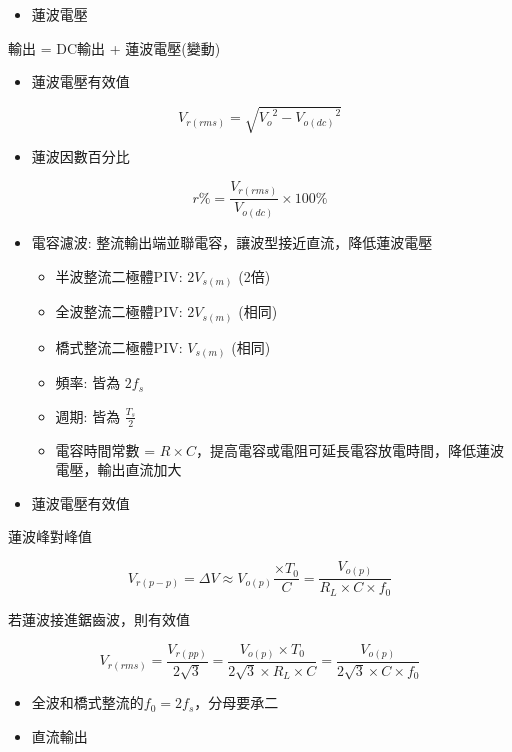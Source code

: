 \documentclass[
]{report}
\providecommand{\tightlist}{%
  \setlength{\itemsep}{0pt}\setlength{\parskip}{0pt}}
\begin{document}
\begin{itemize}
\tightlist
\item
  蓮波電壓
\end{itemize}

輸出 = DC輸出 + 蓮波電壓(變動)

\begin{itemize}
\tightlist
\item
  蓮波電壓有效值
\end{itemize}

\[
V_{r(rms)} = \sqrt{{V_o}^2 - {V_{o(dc)}}^2}
\]

\begin{itemize}
\tightlist
\item
  蓮波因數百分比
\end{itemize}

\[
r\% = \frac{V_{r(rms)}}{V_{o(dc)}} \times 100\%
\]

\begin{itemize}
\tightlist
\item
  電容濾波: 整流輸出端並聯電容，讓波型接近直流，降低蓮波電壓

  \begin{itemize}
  \tightlist
  \item
    半波整流二極體PIV: \(2V_{s(m)}\) (2倍)
  \item
    全波整流二極體PIV: \(2V_{s(m)}\) (相同)
  \item
    橋式整流二極體PIV: \(V_{s(m)}\) (相同)
  \item
    頻率: 皆為 \(2f_s\)
  \item
    週期: 皆為 \(\frac{T_s}{2}\)
  \item
    電容時間常數 =
    \(R \times C\)，提高電容或電阻可延長電容放電時間，降低蓮波電壓，輸出直流加大
  \end{itemize}
\item
  蓮波電壓有效值
\end{itemize}

蓮波峰對峰值

\[
V_{r(p-p)} = \Delta V \approx V_{o(p)} \frac{\times T_0}{C} = \frac{V_{o(p)}}{R_L \times C \times f_0}
\]

若蓮波接進鋸齒波，則有效值

\[
V_{r(rms)} = \frac{V_{r(pp)}}{2 \sqrt{3}} = \frac{V_{o(p)} \times T_0}{2\sqrt{3} \times R_L \times C} = \frac{V_{o(p)}}{2\sqrt{3} \times C \times f_0}
\]

\begin{itemize}
\item
  全波和橋式整流的\(f_0 = 2 f_s\)，分母要承二
\item
  直流輸出
\end{itemize}
\end{document}
